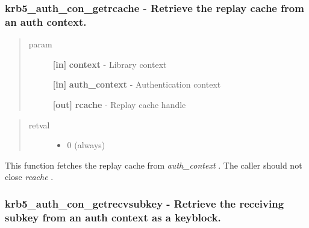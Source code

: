 \documentclass[letterpaper,10pt,english]{sphinxmanual}
\begin{document}
\subsubsection{krb5\_auth\_con\_getrcache -  Retrieve the replay cache from an auth context.}
\label{appdev/refs/api/krb5_auth_con_getrcache:krb5-auth-con-getrcache-retrieve-the-replay-cache-from-an-auth-context}\label{appdev/refs/api/krb5_auth_con_getrcache::doc}

\begin{fulllineitems}
\label{appdev/refs/api/krb5_auth_con_getrcache:c.krb5_auth_con_getrcache}
\end{fulllineitems}

\begin{quote}\begin{description}
\item[{param}] \leavevmode
\textbf{{[}in{]}} \textbf{context} - Library context

\textbf{{[}in{]}} \textbf{auth\_context} - Authentication context

\textbf{{[}out{]}} \textbf{rcache} - Replay cache handle

\end{description}\end{quote}
\begin{quote}\begin{description}
\item[{retval}] \leavevmode\begin{itemize}
\item {} 
0   (always)

\end{itemize}

\end{description}\end{quote}

This function fetches the replay cache from \emph{auth\_context} . The caller should not close \emph{rcache} .


\subsubsection{krb5\_auth\_con\_getrecvsubkey -  Retrieve the receiving subkey from an auth context as a keyblock.}
\label{appdev/refs/api/krb5_auth_con_getrecvsubkey:krb5-auth-con-getrecvsubkey-retrieve-the-receiving-subkey-from-an-auth-context-as-a-keyblock}\label{appdev/refs/api/krb5_auth_con_getrecvsubkey::doc}
\end{document}
